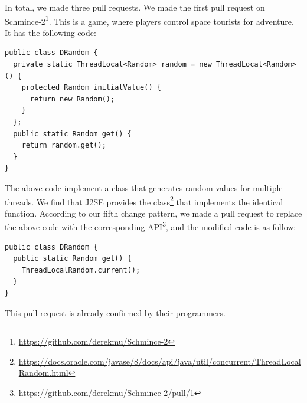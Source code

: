 In total, we made three pull requests. We made the first pull request on Schmince-2\footnote{\url{https://github.com/derekmu/Schmince-2}}. This is a game, where players control space tourists for adventure. It has the following code:

\begin{lstlisting}
public class DRandom {
  private static ThreadLocal<Random> random = new ThreadLocal<Random>() {
    protected Random initialValue() {
      return new Random();
    }
  };
  public static Random get() {
    return random.get();
  }
}
\end{lstlisting}

The above code implement a class that generates random values for multiple threads. We find that J2SE provides the  class\footnote{\url{https://docs.oracle.com/javase/8/docs/api/java/util/concurrent/ThreadLocalRandom.html}} that implements the identical function. According to our fifth change pattern, we made a pull request to replace the above code with the corresponding API\footnote{\url{https://github.com/derekmu/Schmince-2/pull/1}}, and the modified code is as follow:

\begin{lstlisting}
public class DRandom {
  public static Random get() {
    ThreadLocalRandom.current();
  }
}
\end{lstlisting}
This pull request is already confirmed by their programmers.

